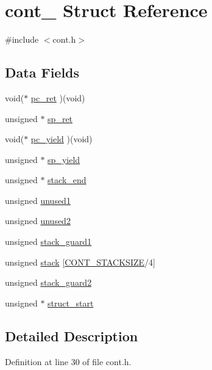 \hypertarget{structcont__}{\section{cont\-\_\- Struct Reference}
\label{structcont__}
}


{\ttfamily \#include $<$cont.\-h$>$}

\subsection*{Data Fields}
\begin{DoxyCompactItemize}
\item 
void($\ast$ \hyperlink{structcont___acf27e0bad3e49daaabf8c8fd48886a0f}{pc\-\_\-ret} )(void)
\item 
unsigned $\ast$ \hyperlink{structcont___a2f886d4182bed43aaf66d3a55a2d23b7}{sp\-\_\-ret}
\item 
void($\ast$ \hyperlink{structcont___ac2253c7d6fab95efa2c4196783b0dc4e}{pc\-\_\-yield} )(void)
\item 
unsigned $\ast$ \hyperlink{structcont___a59ce8d64c25ff1d02ae24c61080bbf7c}{sp\-\_\-yield}
\item 
unsigned $\ast$ \hyperlink{structcont___ab6e542a519497e515e2d3a62030a1f61}{stack\-\_\-end}
\item 
unsigned \hyperlink{structcont___ab61b08c26f5251cdb06e9b2173da911f}{unused1}
\item 
unsigned \hyperlink{structcont___a4571d78e98dbcf7547ea1dc49c7b7a58}{unused2}
\item 
unsigned \hyperlink{structcont___a17c9f5d8bc954cc0381bdbe63d350048}{stack\-\_\-guard1}
\item 
unsigned \hyperlink{structcont___abc9f985ead0aa2c6795818c0bce6f9c1}{stack} \mbox{[}\hyperlink{user__task_8c_a3c0457d493868f331ce63d0ef71aeb3e}{C\-O\-N\-T\-\_\-\-S\-T\-A\-C\-K\-S\-I\-Z\-E}/4\mbox{]}
\item 
unsigned \hyperlink{structcont___af9e24c89ac69a95ae78a6c7f8a237da0}{stack\-\_\-guard2}
\item 
unsigned $\ast$ \hyperlink{structcont___aa75475b47ca0d3a4a691651402c94fa3}{struct\-\_\-start}
\end{DoxyCompactItemize}


\subsection{Detailed Description}


Definition at line 30 of file cont.\-h.



